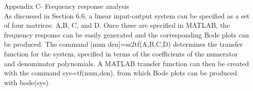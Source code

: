 \documentclass[paper=a4, fontsize=11pt]{scrartcl} %
\numberwithin{equation}{section} %
\numberwithin{figure}{section} %
\numberwithin{table}{section} %
\begin{document}
	Appendix C- Frequency response analysis \\
	As discussed in Section 6.6, a linear input-output system can be specified as a set of four matrices: A,B, C, and D. Once these are specified in MATLAB, the frequency response can be easily generated and the corresponding Bode plots can be produced. The command [num den]=ss2tf(A,B,C,D) determines the transfer function for the system, specified in terms of the coefficients of the numerator and denominator polynomials. A MATLAB transfer function can then be created with the command sys=tf(num,den), from which Bode plots can be produced with bode(sys).
\end{document}
